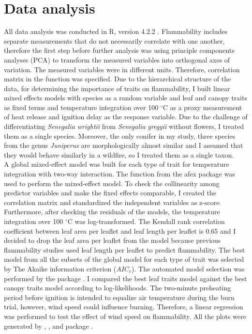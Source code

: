 \documentclass[12pt]{report}
\begin{document}
\section{Data analysis}

All data analysis was conducted in R, version 4.2.2 \citep{team2013r}. Flammability includes separate measurements that do not necessarily correlate with one another, therefore the first step before further analysis was using principle components analyses (PCA) to transform the measured variables into orthogonal axes of variation. The measured variables were in different units. Therefore, correlation matrix in the  function was specified. Due to the hierarchical structure of the data, for determining the importance of traits on flammability, I built linear mixed effects models with species as a random variable and leaf and canopy traits as fixed terms and temperature integration over 100 $^{\circ}$C as a proxy measurement of heat release and ignition delay as the response variable. Due to the challenge of differentiating \emph{Senegalia wrightii} from \emph{Senegalia greggii} without flowers, I treated them as a single species. Moreover, the only conifer in my study, three species from the genus \emph{Juniperus} are morphologically almost similar and I assumed that they would behave similarly in a wildfire, so I treated them as a single taxon.\\

A global mixed-effect model was built for each type of trait for temperature integration with two-way interaction. The  function from the afex package \citep{singmann2015packageafex,afexluke2017evaluating} was used to perform the mixed-effect model. To check the collinearity among predictor variables and make the fixed effects comparable, I created the correlation matrix and standardized the independent variables as z-score. Furthermore, after checking the residuals of the models, the temperature integration over 100 $^{\circ}$C was log-transformed. The Kendall rank correlation coefficient between leaf area per leaflet and leaf length per leaflet is 0.65 and I decided to drop the leaf area per leaflet from the model because previous flammability studies used leaf length per leaflet to predict flammability. The best model from all the subsets of the global model for each type of trait was selected by The Akaike information criterion ($AIC_{c}$). The automated model selection was performed by the  package \citep{barton2015packagemumin}. I compared the best leaf traits model against the best canopy traits model according to log-likelihoods. The two-minute preheating period before ignition is intended to equalize air temperature during the burn trial, however, wind speed could influence burning. Therefore, a linear regression was performed to test the effect of wind speed on flammability. All the plots were generated by , , and  package \citep{wickham2016packageggplot2, kassambara2017packagefactoextra,kassambara2020package}.\\
\end{document}
